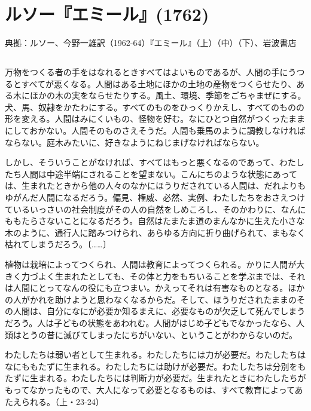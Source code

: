 \section{ルソー『エミール』(1762)}



典拠：ルソー、今野一雄訳（1962-64）『エミール』（上）（中）（下）、岩波書店

\subsection{}



万物をつくる者の手をはなれるときすべてはよいものであるが、人間の手にうつるとすべてが悪くなる。人間はある土地にほかの土地の産物をつくらせたり、ある木にほかの木の実をならせたりする。風土、環境、季節をごちゃまぜにする。犬、馬、奴隷をかたわにする。すべてのものをひっくりかえし、すべてのものの形を変える。人間はみにくいもの、怪物を好む。なにひとつ自然がつくったままにしておかない。人間そのものさえそうだ。人間も乗馬のように調教しなければならない。庭木みたいに、好きなようにねじまげなければならない。

しかし、そういうことがなければ、すべてはもっと悪くなるのであって、わたしたち人間は中途半端にされることを望まない。こんにちのような状態にあっては、生まれたときから他の人々のなかにほうりだされている人間は、だれよりもゆがんだ人間になるだろう。偏見、権威、必然、実例、わたしたちをおさえつけているいっさいの社会制度がその人の自然をしめころし、そのかわりに、なんにももたらさないことになるだろう。自然はたまたま道のまんなかに生えた小さな木のように、通行人に踏みつけられ、あらゆる方向に折り曲げられて、まもなく枯れてしまうだろう。〔……〕

植物は栽培によってつくられ、人間は教育によってつくられる。かりに人間が大きく力づよく生まれたとしても、その体と力をもちいることを学ぶまでは、それは人間にとってなんの役にも立つまい。かえってそれは有害なものとなる。ほかの人がかれを助けようと思わなくなるからだ。そして、ほうりだされたままのその人間は、自分になにが必要か知るまえに、必要なものが欠乏して死んでしまうだろう。人は子どもの状態をあわれむ。人間がはじめ子どもでなかったなら、人類はとうの昔に滅びてしまったにちがいない、ということがわからないのだ。

わたしたちは弱い者として生まれる。わたしたちには力が必要だ。わたしたちはなにももたずに生まれる。わたしたちには助けが必要だ。わたしたちは分別をもたずに生まれる。わたしたちには判断力が必要だ。生まれたときにわたしたちがもってなかったもので、大人になって必要となるものは、すべて教育によってあたえられる。（上・23-24）

